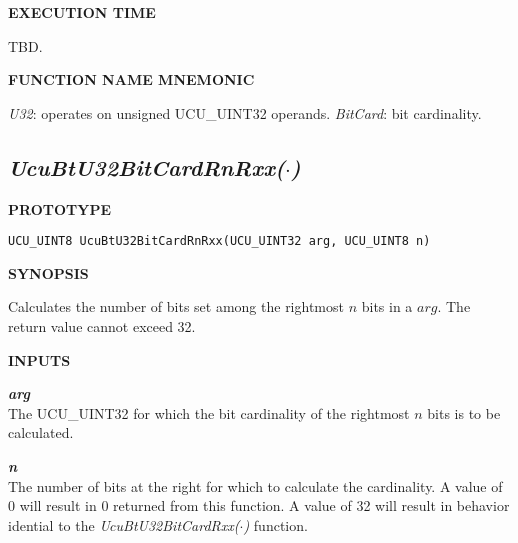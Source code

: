 \noindent\textbf{EXECUTION TIME}
\begin{list}{}{\setlength{\leftmargin}{0.25in}\setlength{\topsep}{0.0in}}
\item TBD.
\end{list}
\vspace{2.8ex}

\noindent\textbf{FUNCTION NAME MNEMONIC}
\begin{list}{}{\setlength{\leftmargin}{0.25in}\setlength{\topsep}{0.0in}}
\item \emph{U32}: operates on unsigned UCU\_UINT32 operands.
      \emph{BitCard}: bit cardinality.
\end{list}


\subsection[\emph{UcuBtU32BitCardRnRxx(\protect\mbox{\protect$\cdot$})}]
           {\emph{UcuBtU32BitCardRnRxx(\protect\mbox{\protect\boldmath $\cdot$})}}
\label{cbsf0:sbcf0:sbcr0}

%

\noindent\textbf{PROTOTYPE}
\begin {list}{}{\setlength{\leftmargin}{0.25in}\setlength{\topsep}{0.0in}}
\item
\begin{verbatim}
UCU_UINT8 UcuBtU32BitCardRnRxx(UCU_UINT32 arg, UCU_UINT8 n)
\end{verbatim}
\end{list}
\vspace{2.8ex}

\noindent\textbf{SYNOPSIS}
\begin{list}{}{\setlength{\leftmargin}{0.25in}\setlength{\topsep}{0.0in}}
\item Calculates the number of bits set among the rightmost
      $n$ bits in a $arg$.  The return value cannot
      exceed 32.
\end{list}
\vspace{2.8ex}

\noindent\textbf{INPUTS}
\begin{list}{}{\setlength{\leftmargin}{0.5in}\setlength{\itemindent}{-0.25in}\setlength{\topsep}{0.0in}\setlength{\partopsep}{0.0in}}
\item \emph{\textbf{arg}}\\
      The UCU\_UINT32 for which the bit cardinality 
      of the rightmost $n$ bits is to be calculated.
\item \emph{\textbf{n}}\\
      The number of bits at the right for which to
      calculate the cardinality.  A value of 0 will 
      result in 0 returned from this function.  A
      value of 32 will result in behavior idential to the
      \emph{UcuBtU32BitCardRxx($\cdot$)} function.
\end{list}
\vspace{2.8ex}

